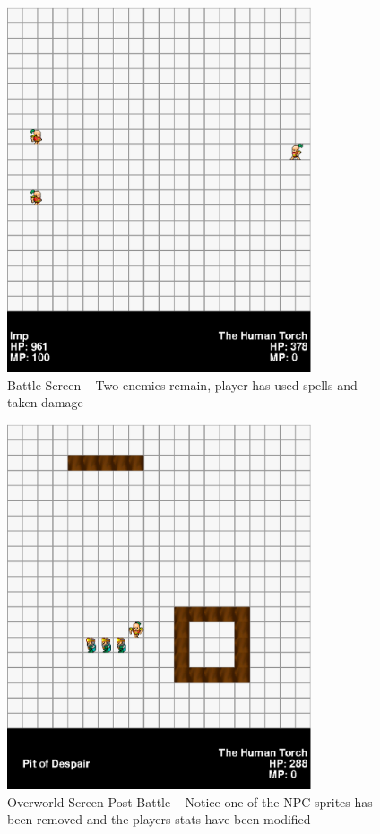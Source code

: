 \documentclass[11pt]{article}
\begin{document}
\begin{figure}[h!]
\begin{center}
\leavevmode
\includegraphics[width=0.8\textwidth]{images/battle_middle}
\end{center}
\caption{Battle Screen -- Two enemies remain, player has used spells and taken damage}
\end{figure}
\newpage

\begin{figure}[h!]
\begin{center}
\leavevmode
\includegraphics[width=0.8\textwidth]{images/overworld_postbattle}
\end{center}
\caption{Overworld Screen Post Battle -- Notice one of the NPC sprites has been removed and the players stats have been modified}
\end{figure}
\newpage
\end{document}
